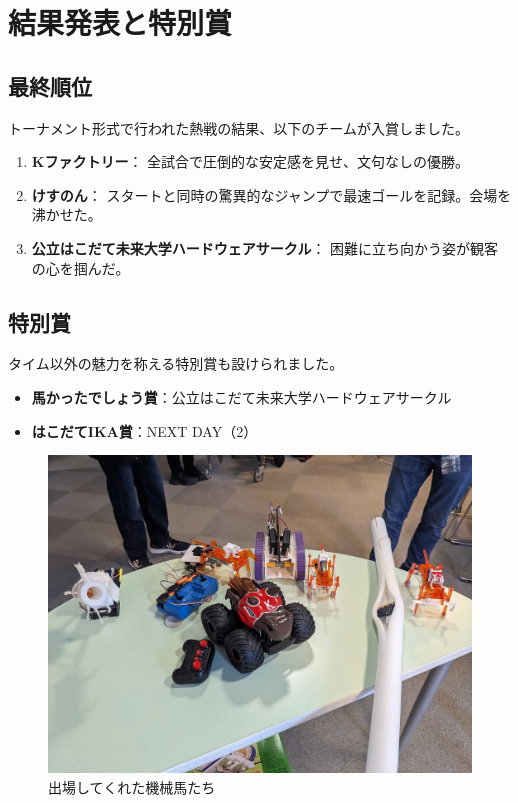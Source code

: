 \chapter{結果発表と特別賞}
\section{最終順位}
トーナメント形式で行われた熱戦の結果、以下のチームが入賞しました。

\begin{enumerate}
  \item \textbf{Kファクトリー}：  
  全試合で圧倒的な安定感を見せ、文句なしの優勝。
  
  \item \textbf{けすのん}：  
  スタートと同時の驚異的なジャンプで最速ゴールを記録。会場を沸かせた。
  
  \item \textbf{公立はこだて未来大学ハードウェアサークル}：  
  困難に立ち向かう姿が観客の心を掴んだ。
\end{enumerate}

\section{特別賞}
タイム以外の魅力を称える特別賞も設けられました。

\begin{itemize}
  \item \textbf{馬かったでしょう賞}：公立はこだて未来大学ハードウェアサークル
  
  \item \textbf{はこだてIKA賞}：NEXT DAY（2）
\end{itemize}

\begin{figure}[h]
\centering
\includegraphics[width=0.7\linewidth]{pages/images/all-robots.png}
\caption{出場してくれた機械馬たち}
\end{figure}

